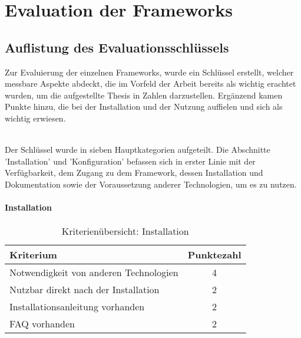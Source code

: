 \chapter{Evaluation der \Gls{Framework}s}
\section{Auflistung des Evaluationsschlüssels}

Zur Evaluierung der einzelnen \Gls{Framework}s, wurde ein Schlüssel erstellt, welcher messbare Aspekte abdeckt, die im Vorfeld der Arbeit bereits als wichtig erachtet wurden, um die aufgestellte Thesis in Zahlen darzustellen. Ergänzend kamen Punkte hinzu, die bei der Installation und der Nutzung auffielen und sich als wichtig erwiesen. 

\\Der Schlüssel wurde in sieben Hauptkategorien aufgeteilt. Die Abschnitte 'Installation' und 'Konfiguration' befassen sich in erster Linie mit der Verfügbarkeit, dem Zugang zu dem \Gls{Framework}, dessen Installation und Dokumentation sowie der Voraussetzung anderer Technologien, um es zu nutzen.

\subsubsection{Installation}
\begin{table}[H]
 	\vspace{-30pt}
 	\centering
		\begin{tabular}{| p{12cm} | c|}
			\hline
				Kriterium		 &	Punktezahl\\
			\hline
			\hline
				Notwendigkeit von anderen Technologien				&4\\
				Nutzbar direkt nach der Installation			&	2	\\
				Installationsanleitung vorhanden			&	2	\\
				FAQ vorhanden				&	2	\\
				\hline
		\end{tabular}
	\caption{Kriterienübersicht: Installation}
\end{table}

